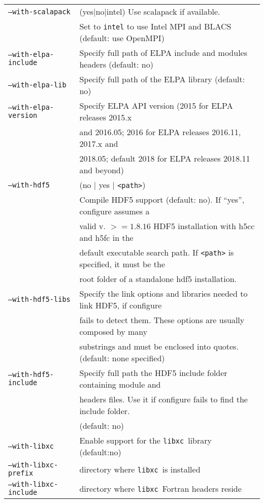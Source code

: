 \documentclass[12pt,a4paper]{article}
\def\libxc{\texttt{libxc}}
\begin{document}
\begin{tabular}{ll}
\texttt{--with-scalapack}&        (yes$|$no$|$intel) Use scalapack if available. \\
      &Set to \texttt{intel} to use Intel MPI and BLACS (default: use OpenMPI)\\
\texttt{--with-elpa-include}&   Specify full path of ELPA include and modules
  headers (default: no)\\
\texttt{--with-elpa-lib}& Specify full path of the ELPA library
	                          (default: no)\\
\texttt{--with-elpa-version}& Specify ELPA API version (2015 for ELPA releases 2015.x\\
                            & and 2016.05; 2016 for ELPA releases 2016.11, 2017.x and\\
                            & 2018.05; default 2018 for ELPA releases 2018.11 and beyond)\\
\texttt{--with-hdf5}&  (no $|$  yes $|$ \texttt{<path>}) \\
	                    & Compile HDF5 support (default: no). If ``yes'', configure assumes a \\
                            & valid v. $>=1.8.16$ HDF5 installation with h5cc and h5fc in the \\
                            &  default executable search path. If \texttt{<path>} is specified, it must be the  \\
                            & root folder of a standalone hdf5 installation. \\
\texttt{--with-hdf5-libs}   & Specify the link options and libraries needed to link HDF5, if configure \\
                            &  fails to detect them. These options are usually composed by many \\
                            & substrings and must be enclosed into quotes. (default: none specified)   \\
\texttt{--with-hdf5-include}& Specify full path the HDF5 include folder containing module and \\
&  headers files. Use it if configure fails to find the include folder. \\
                             & (default: no)\\
\texttt{--with-libxc}        & Enable support for the \libxc\ library (default:no) \\
\texttt{--with-libxc-prefix} & directory where \libxc\ is installed \\
\texttt{--with-libxc-include}& directory where \libxc\ Fortran headers reside\\
\end{tabular}\\
\end{document}
